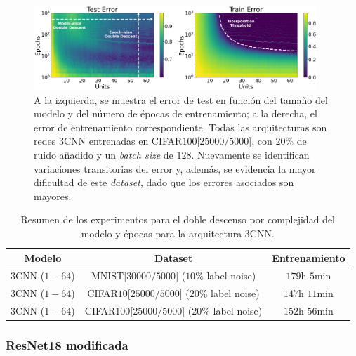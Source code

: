 \begin{figure}[h]
    \centering
    \includegraphics[width=0.95\textwidth]{img/experiments/model-epoch3CNNCIFAR10025k.png}
    \caption[Doble descenso en función del tamaño del modelo y del número de épocas para la red $3$CNN y un subconjunto de CIFAR$100$.]{A la izquierda, se muestra el error de test en función del tamaño del modelo y del número de épocas de entrenamiento; a la derecha, el error de entrenamiento correspondiente. Todas las arquitecturas son redes $3$CNN entrenadas en CIFAR$100$[$25000/5000$], con $20\%$ de ruido añadido y un \textit{batch size} de $128$. Nuevamente se identifican variaciones transitorias del error y, además, se evidencia la mayor dificultad de este \textit{dataset}, dado que los errores asociados son mayores.}\label{fig:model-epoch3CNNCIFAR10025k}
\end{figure}

\begin{table}[h!]
    \centering
    \begin{tabular}{|c|c|c|}
    \hline
    \textbf{Modelo}       & \textbf{Dataset} & \textbf{Entrenamiento} \\ 
    \hline
    $3$CNN ($1-64$)      & MNIST[$30000/5000$] ($10$\% label noise)        & $179$h $5$min \\ 
    $3$CNN ($1-64$)      & CIFAR$10$[$25000/5000$]  ($20$\% label noise)   & $147$h $11$min \\
    $3$CNN ($1-64$)      & CIFAR$100$[$25000/5000$]  ($20$\% label noise)   & $152$h $56$min \\
    \hline
    \end{tabular}
    \caption[Resumen de los experimentos para el doble descenso por complejidad del modelo y épocas para la arquitectura $3$CNN.]{Resumen de los experimentos para el doble descenso por complejidad del modelo y épocas para la arquitectura $3$CNN.}\label{tab:3cnn_model-epochwise}
\end{table}

\subsubsection{ResNet18 modificada}\label{subsubsec:model-epoch-wise-ResNet18 modificada}

